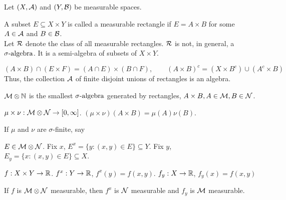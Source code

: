 %

Let $(X, {\mathcal A})$ and $(Y, {\mathcal B})$ be measurable spaces. 
\begin{dfn} A subset $E \subseteq X \times Y$ is called a measurable rectangle if $E=A \times B$ for some $A \in {\mathcal A}$ and $B \in {\mathcal B}$. \\
Let ${\mathcal R}$ denote the class of all measurable rectangles. ${\mathcal R}$ is not, in general, a ${\sigma}\text{-algebra}$. It is a semi-algebra of subsets of $X \times Y$. 
\end{dfn}
\begin{rmk}
\[
(A \times B) \cap (E \times F) = (A \cap E) \times (B \cap F), \qquad (A \times B)^c = (X \times B^c) \cup (A^c \times B)
\]	
Thus, the collection ${\mathcal A}$ of finite disjoint unions of rectangles is an algebra. 
\end{rmk}

\begin{dfn}
${\mathcal M} \otimes {\mathbb N}$ is the smallest ${\sigma}\text{-algebra}$ generated by rectangles, $A \times B, A \in {\mathcal M}, B \in {\mathcal N}$. 	
\end{dfn}
\begin{dfn}
$\mu \times \nu: {\mathcal M} \otimes {\mathcal N} \rightarrow [0, \infty]$. $(\mu\times \nu)(A\times B)=\mu(A)\nu(B)$.	
\end{dfn}
\begin{rmk}
If $\mu$ and $\nu$ are $\sigma$-finite, say 	
\end{rmk}

\begin{dfn}
$E \in {\mathcal M} \otimes {\mathcal N}$. Fix $x$, $E^x= \{ y: (x,y)\in E \}\subseteq Y$. Fix $y$, $E_y=\{x: (x,y) \in E\} \subseteq X$.	
\end{dfn}
\begin{dfn}
$f: X \times Y \rightarrow {\mathbb R}$. $f^x: Y \rightarrow {\mathbb R}$, $f^x(y)=f(x,y)$. $f_y: X \rightarrow {\mathbb R}$, $f_y(x) = f(x,y)$	
\end{dfn}
\begin{thm}
If $f$ is ${\mathcal M} \otimes {\mathcal N}$ measurable, then $f^x$ is ${\mathcal N}$ measurable and $f_y$ is ${\mathcal M}$ measurable.	
\end{thm}

